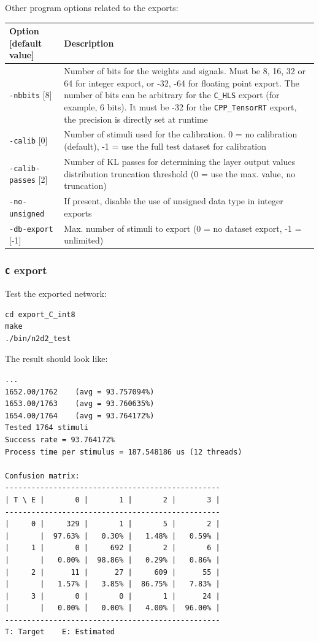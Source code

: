 \documentclass[a4paper,11pt,oneside]{article}
\begin{document}
Other program options related to the exports:
\begin{center}
 \begin{tabular}{| p{5cm} | p{10cm} | }
 \hline
 Option [default value] & Description\\
 \hline\hline
  \lstinline!-nbbits! [8] & Number of bits for the weights and signals.
  Must be 8, 16, 32 or 64 for integer export, or -32, -64 for floating
  point export. The number of bits can be arbitrary for the \lstinline!C_HLS!
  export (for example, 6 bits). It must be -32 for the \lstinline!CPP_TensorRT! export,
  the precision is directly set at runtime\\
  \lstinline!-calib! [0] & Number of stimuli used for the calibration.
  0 = no calibration (default),
  -1 = use the full test dataset for calibration \\
  \lstinline!-calib-passes! [2] & Number of KL passes for determining the layer
  output values distribution truncation threshold (0 = use the max. value,
  no truncation) \\
  \lstinline!-no-unsigned! & If present, disable the use of unsigned data type
  in integer exports \\
  \lstinline!-db-export! [-1] & Max. number of stimuli to export
  (0 = no dataset export, -1 = unlimited) \\
 \hline
\end{tabular}
\end{center}

\subsubsection{\texorpdfstring{%
\lstinline[basicstyle=\ttfamily\bfseries]!C! export}{C export}}

Test the exported network:
\begin{lstlisting}
cd export_C_int8
make
./bin/n2d2_test
\end{lstlisting}

The result should look like:
\begin{lstlisting}[style=console]
...
1652.00/1762    (avg = 93.757094%)
1653.00/1763    (avg = 93.760635%)
1654.00/1764    (avg = 93.764172%)
Tested 1764 stimuli
Success rate = 93.764172%
Process time per stimulus = 187.548186 us (12 threads)

Confusion matrix:
-------------------------------------------------
| T \ E |       0 |       1 |       2 |       3 |
-------------------------------------------------
|     0 |     329 |       1 |       5 |       2 |
|       |  97.63% |   0.30% |   1.48% |   0.59% |
|     1 |       0 |     692 |       2 |       6 |
|       |   0.00% |  98.86% |   0.29% |   0.86% |
|     2 |      11 |      27 |     609 |      55 |
|       |   1.57% |   3.85% |  86.75% |   7.83% |
|     3 |       0 |       0 |       1 |      24 |
|       |   0.00% |   0.00% |   4.00% |  96.00% |
-------------------------------------------------
T: Target    E: Estimated
\end{lstlisting}
\end{document}
